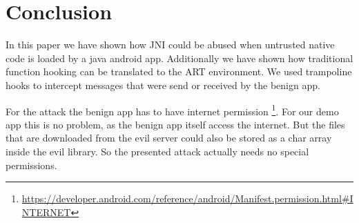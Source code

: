 \section{Conclusion}

In this paper we have shown how JNI could be abused when untrusted native code is loaded by a java android app. Additionally we have shown how traditional function hooking can be translated to the ART environment. We used trampoline hooks to intercept messages that were send or received by the benign app.

For the attack the benign app has to have internet permission \footnote{\url{https://developer.android.com/reference/android/Manifest.permission.html\#INTERNET}}. For our demo app this is no problem, as the benign app itself access the internet. But the files that are downloaded from the evil server could also be stored as a char array inside the evil library. So the presented attack actually needs no special permissions.
